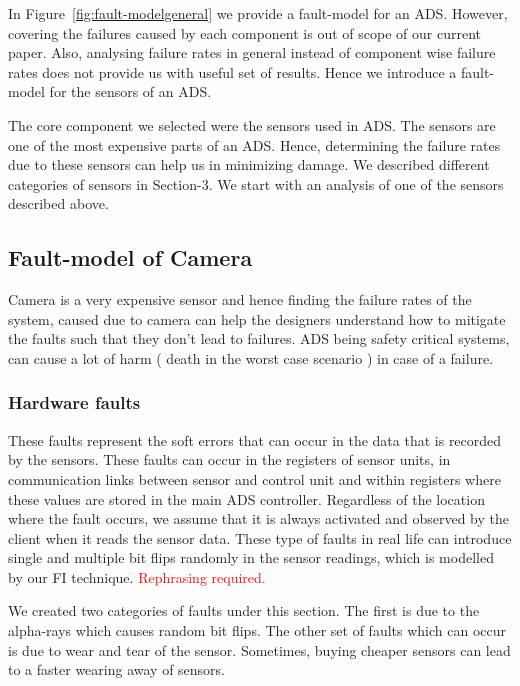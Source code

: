 




In Figure~\ref{fig:fault-modelgeneral} we provide a fault-model for an ADS. However, covering the failures caused by each component is out of scope of our current paper. Also, analysing failure rates in general instead of component wise failure rates does not provide us with useful set of results. Hence we introduce a fault-model for the sensors of an ADS. 

 The core component we selected were the  sensors used in ADS. The sensors are one of the most expensive parts of an ADS. Hence, determining the failure rates due to these sensors can help us in minimizing damage. We described different categories of sensors in Section-3. We start with an analysis of one of the sensors described above.
 
 \subsection{Fault-model of Camera}
 Camera is a very expensive sensor and hence finding the failure rates of the system, caused due to camera can help the designers understand how to mitigate the faults such that they don't lead to failures. ADS being safety critical systems, can cause a lot of harm ( death in the worst case scenario ) in case of a failure. 
 
 \subsubsection{Hardware faults} These faults represent the soft errors that can occur in the data that is recorded by the sensors. These faults can occur in the registers of sensor units, in communication links between sensor and control unit and within registers where these values are stored in the main ADS controller. Regardless of the location where the fault occurs, we assume that it is always activated and observed by the client when it reads the sensor data. These type of faults in real life can introduce single and multiple bit flips randomly in the sensor readings, which is modelled by our FI technique. 
 \textcolor{red}{Rephrasing required. 
 } 
 
 
 We created two categories of faults under this section. The first is due to the alpha-rays which causes random bit flips. The other set of faults which can occur is due to wear and tear of the sensor. Sometimes, buying cheaper sensors can lead to a faster wearing away of sensors. 
 
